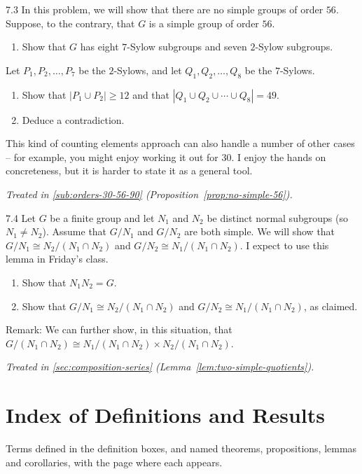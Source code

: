 \documentclass[11pt]{report}
\begin{document}
\begin{hwbox}{7.3}\label{hw:7.3}
In this problem, we will show that there are no simple groups of order $56$. Suppose, to the contrary, that $G$ is a simple group of order $56$.
\begin{enumerate}
\item Show that $G$ has eight $7$-Sylow subgroups and seven $2$-Sylow subgroups.
\end{enumerate}
Let $P_1, P_2, \dots, P_7$ be the $2$-Sylows, and let $Q_1, Q_2, \dots, Q_8$ be the $7$-Sylows.
\begin{enumerate}[resume]
\item Show that $|P_1 \cup P_2| \geq 12$ and that $|Q_1 \cup Q_2 \cup \cdots \cup Q_8| = 49$.
\item Deduce a contradiction.
\end{enumerate}
This kind of counting elements approach can also handle a number of other cases -- for example, you might enjoy working it out for $30$. I enjoy the hands on concreteness, but it is harder to state it as a general tool.
\end{hwbox}
\textit{Treated in \ref{sub:orders-30-56-90} (Proposition~\ref{prop:no-simple-56}).}

\begin{hwbox}{7.4}\label{hw:7.4}
Let $G$ be a finite group and let $N_1$ and $N_2$ be distinct normal subgroups (so $N_1 \neq N_2$). Assume that $G/N_1$ and $G/N_2$ are both simple. We will show that $G/N_1 \cong N_2/(N_1 \cap N_2)$ and $G/N_2 \cong N_1/(N_1 \cap N_2)$. I expect to use this lemma in Friday's class.
\begin{enumerate}
\item Show that $N_1 N_2 = G$.
\item Show that $G/N_1 \cong N_2/(N_1 \cap N_2)$ and $G/N_2 \cong N_1/(N_1 \cap N_2)$, as claimed.
\end{enumerate}
Remark: We can further show, in this situation, that $G/(N_1 \cap N_2) \cong N_1/(N_1 \cap N_2) \times N_2/(N_1 \cap N_2)$.
\end{hwbox}
\textit{Treated in \ref{sec:composition-series} (Lemma~\ref{lem:two-simple-quotients}).}

\chapter{Index of Definitions and Results}\label{ch:index}

Terms defined in the definition boxes, and named theorems, propositions, lemmas and corollaries, with the page where each appears.
\end{document}
